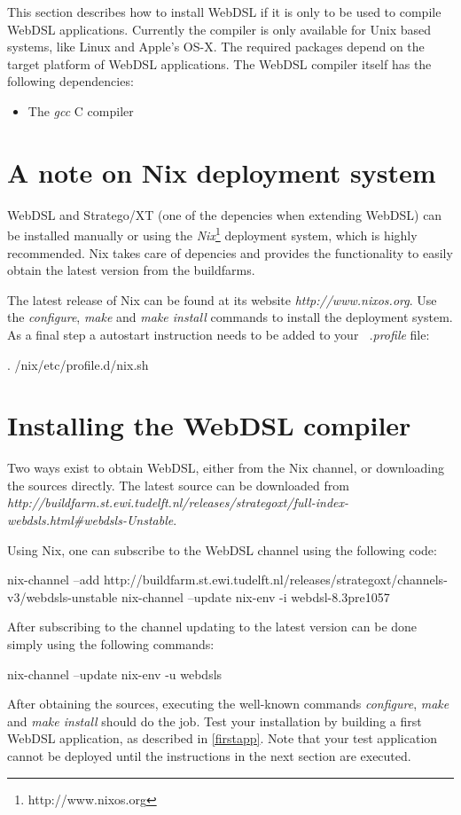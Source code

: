 This section describes how to install WebDSL if it is only to be used to compile WebDSL applications. Currently the compiler is only available for Unix based systems, like Linux and Apple's OS-X. The required packages depend on the target platform of WebDSL applications. The WebDSL compiler itself has the following dependencies:
\begin{itemize}
	\item The \emph{gcc} C compiler
\end{itemize}

\section{A note on Nix deployment system}\label{installnix}
WebDSL and Stratego/XT (one of the depencies when extending WebDSL) can be installed manually or using the \emph{Nix}\footnote{http://www.nixos.org} deployment system, which is highly recommended. Nix takes care of depencies and provides the functionality to easily obtain the latest version from the buildfarms.

The latest release of Nix can be found at its website \emph{http://www.nixos.org}. Use the \emph{configure}, \emph{make} and \emph{make install} commands to install the deployment system. As a final step a autostart instruction needs to be added to your \emph{~.profile} file:
\begin{shell}
. /nix/etc/profile.d/nix.sh
\end{shell}

\section{Installing the WebDSL compiler}\label{retreivewebdsl}
Two ways exist to obtain WebDSL, either from the Nix channel, or downloading the sources directly. The latest source can be downloaded from \emph{http://buildfarm.st.ewi.tudelft.nl/releases/strategoxt/full-index-webdsls.html\#webdsls-Unstable}.

Using Nix, one can subscribe to the WebDSL channel using the following code: 
\begin{shell}
nix-channel --add http://buildfarm.st.ewi.tudelft.nl/releases/strategoxt/channels-v3/webdsls-unstable
nix-channel --update
nix-env -i webdsl-8.3pre1057
\end{shell}
After subscribing to the channel updating to the latest version can be done simply using the following commands:
\begin{shell}
nix-channel --update
nix-env -u webdsls
\end{shell}
After obtaining the sources, executing the well-known commands \emph{configure}, \emph{make} and \emph{make install} should do the job. Test your installation by building a first WebDSL application, as described in \ref{firstapp}. Note that your test application cannot be deployed until the instructions in the next section are executed. 

